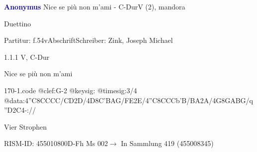 \documentclass[twocolumn]{book}
\begin{document}
\par \vspace{7pt} \textcolor{darkblue}{\textbf{Anonymus  }}\hfillplus{\textbf{[170]}}\newline Nice se più non m'ami - C-Dur\newline V (2), mandora
\par \begin{itshape}[at left, f.54v:] Duettino\end{itshape} 
\par \textcolor{darkblue}{}  Partitur: f.54v\newline Abschrift\newline Schreiber: Zink, Joseph Michael
\par 1.1.1  V, C-Dur\newline \begin{footnotesize} Nice se più non m'ami \end{footnotesize}  
\begin{filecontents*}{170-1.code}
@clef:G-2
@keysig:
@timesig:3/4
@data:4''C8CCCC/{CD}2D/4D8C'BAG/{FE}2E/4''C8CCCb'B/{BA}2A/4G8GABG/q''D2C4-://
\end{filecontents*}
\newline
%
\par Vier Strophen
\par RISM-ID: 455010800\newline D-Fh  Ms 002\newline $\rightarrow$ In Sammlung 419 (455008345)
      
\end{document}
